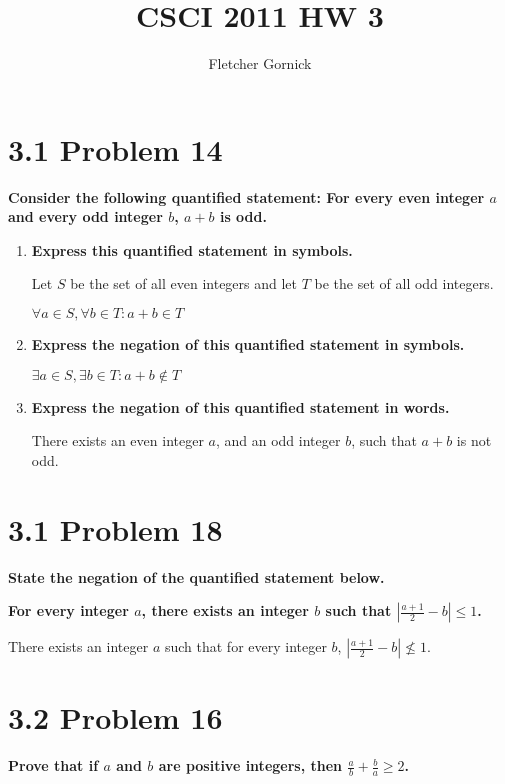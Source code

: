 \documentclass[10pt]{article}
\title{CSCI 2011 HW 3}
\author{Fletcher Gornick}
\def \n {\par \vspace{\baselineskip}}
\begin{document}
\maketitle

\section{3.1 Problem 14}
\textbf{Consider the following quantified statement: For every even integer $a$ and every odd integer
$b$, $a + b$ is odd.}

\begin{enumerate}[label=(\alph*)]
    
    \item \textbf{Express this quantified statement in symbols.}

        Let $S$ be the set of all even integers and let $T$ be the set of all odd integers.

        $\forall a \in S, \forall b \in T: a+b \in T$


    \item \textbf{Express the negation of this quantified statement in symbols.}

        $\exists a \in S, \exists b \in T: a+b \not\in T$
        

    \item \textbf{Express the negation of this quantified statement in words.}

        There exists an even integer $a$, and an odd integer $b$, such that $a+b$ is not odd.


\end{enumerate}



\section{3.1 Problem 18}
\textbf{State the negation of the quantified statement below.}

\textbf{For every integer $a$, there exists an integer $b$ such that $|\frac{a+1}{2} - b| \leq 1$.}

\n
There exists an integer $a$ such that for every integer $b$, $|\frac{a+1}{2} - b| \nleq 1$.


\section{3.2 Problem 16}
\textbf{Prove that if $a$ and $b$ are positive integers, then $\frac{a}{b} + \frac{b}{a} \geq 2$.}
\end{document}

